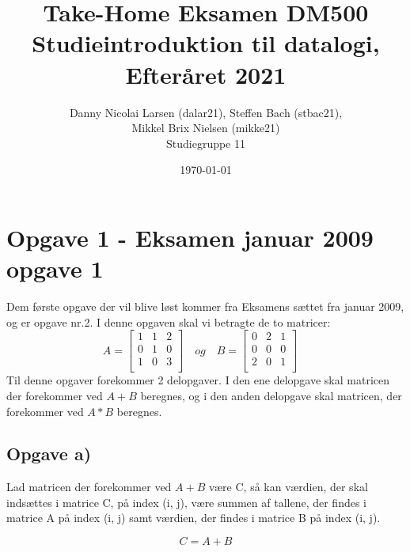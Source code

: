 \documentclass[20pt]{article}
\title{Take-Home Eksamen DM500 Studieintroduktion til datalogi, Efteråret 2021}
\author{Danny Nicolai Larsen (dalar21), Steffen Bach (stbac21),\\ Mikkel Brix Nielsen (mikke21) \\ Studiegruppe 11}
\date{\today}
\begin{document}
	\clearpage
	\maketitle
	\thispagestyle{empty}
	\newpage
	\section*{Opgave 1 - Eksamen januar 2009 opgave 1}
	Dem første opgave der vil blive løst kommer fra Eksamens sættet fra januar 2009, og er opgave nr.2.
	I denne opgaven skal vi betragte de to matricer:
	$$ 
	A = 
	\begin{bmatrix} 
		1 & 1 & 2 \\
		0 & 1 & 0 \\
		1 & 0 & 3 \\
	\end{bmatrix}
 	\quad og \quad B = 
	\begin{bmatrix} 
		0 & 2 & 1 \\
		0 & 0 & 0 \\
		2 & 0 & 1 \\
	\end{bmatrix}
	\quad
	$$
	Til denne opgaver forekommer 2 delopgaver. I den ene delopgave skal matricen der forekommer ved \(A+B\) beregnes, og i den anden delopgave skal matricen, der forekommer ved \(A*B\) beregnes.	
	
	\subsection*{Opgave a)}
	Lad matricen der forekommer ved \(A+B\) være C, så kan værdien, der skal indsættes i  matrice C, på index (i, j), være summen af tallene, der findes i matrice A på index (i, j) samt værdien, der findes i matrice B på index (i, j).
	
	\begin{equation}
		C = A+B
	\end{equation}
\end{document}
